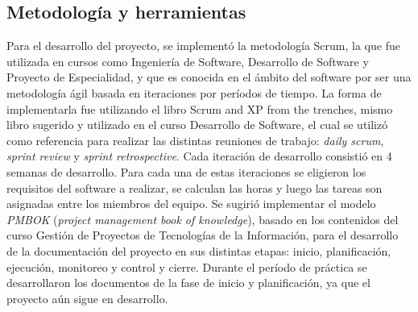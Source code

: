    
 
   
 
   
 


\subsection{Metodología y herramientas}

Para el desarrollo del proyecto, se implementó la metodología Scrum, la que fue utilizada en cursos como Ingeniería de Software, Desarrollo de Software y Proyecto de Especialidad, y que es conocida en el ámbito del software por ser una metodología ágil basada en iteraciones por períodos de tiempo. La forma de implementarla fue utilizando el libro Scrum and XP from the trenches, mismo libro sugerido y utilizado en el curso Desarrollo de Software, el cual se utilizó como referencia para realizar las distintas reuniones de trabajo: \textit{daily scrum}, \textit{sprint review} y \textit{sprint retrospective}. Cada iteración de desarrollo consistió en 4 semanas de desarrollo. Para cada una de estas iteraciones se eligieron los requisitos del software a realizar, se calculan las horas y luego las tareas son asignadas entre los miembros del equipo.
Se sugirió implementar el modelo \textit{PMBOK} (\textit{project management book of knowledge}), basado en los contenidos del curso Gestión de Proyectos de Tecnologías de la Información, para el desarrollo de la documentación del proyecto en sus distintas etapas: inicio, planificación, ejecución, monitoreo y control y cierre. Durante el período de práctica se desarrollaron los documentos de la fase de inicio y planificación, ya que el proyecto aún sigue en desarrollo.

